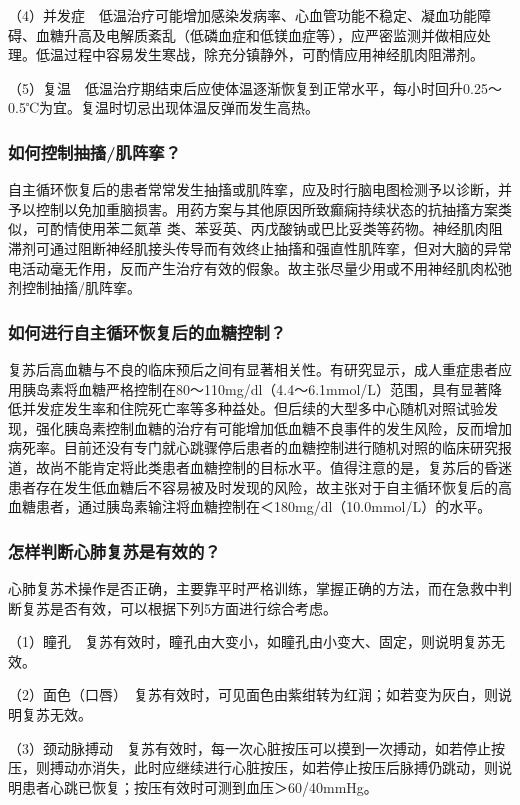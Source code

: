 （4）并发症　低温治疗可能增加感染发病率、心血管功能不稳定、凝血功能障碍、血糖升高及电解质紊乱（低磷血症和低镁血症等），应严密监测并做相应处理。低温过程中容易发生寒战，除充分镇静外，可酌情应用神经肌肉阻滞剂。

（5）复温　低温治疗期结束后应使体温逐渐恢复到正常水平，每小时回升0.25～0.5℃为宜。复温时切忌出现体温反弹而发生高热。

\subsubsection{如何控制抽搐/肌阵挛？}

自主循环恢复后的患者常常发生抽搐或肌阵挛，应及时行脑电图检测予以诊断，并予以控制以免加重脑损害。用药方案与其他原因所致癫痫持续状态的抗抽搐方案类似，可酌情使用苯二氮䓬
类、苯妥英、丙戊酸钠或巴比妥类等药物。神经肌肉阻滞剂可通过阻断神经肌接头传导而有效终止抽搐和强直性肌阵挛，但对大脑的异常电活动毫无作用，反而产生治疗有效的假象。故主张尽量少用或不用神经肌肉松弛剂控制抽搐/肌阵挛。

\subsubsection{如何进行自主循环恢复后的血糖控制？}

复苏后高血糖与不良的临床预后之间有显著相关性。有研究显示，成人重症患者应用胰岛素将血糖严格控制在80～110mg/dl（4.4～6.1mmol/L）范围，具有显著降低并发症发生率和住院死亡率等多种益处。但后续的大型多中心随机对照试验发现，强化胰岛素控制血糖的治疗有可能增加低血糖不良事件的发生风险，反而增加病死率。目前还没有专门就心跳骤停后患者的血糖控制进行随机对照的临床研究报道，故尚不能肯定将此类患者血糖控制的目标水平。值得注意的是，复苏后的昏迷患者存在发生低血糖后不容易被及时发现的风险，故主张对于自主循环恢复后的高血糖患者，通过胰岛素输注将血糖控制在＜180mg/dl（10.0mmol/L）的水平。

\subsubsection{怎样判断心肺复苏是有效的？}

心肺复苏术操作是否正确，主要靠平时严格训练，掌握正确的方法，而在急救中判断复苏是否有效，可以根据下列5方面进行综合考虑。

（1）瞳孔　复苏有效时，瞳孔由大变小，如瞳孔由小变大、固定，则说明复苏无效。

（2）面色（口唇）　复苏有效时，可见面色由紫绀转为红润；如若变为灰白，则说明复苏无效。

（3）颈动脉搏动　复苏有效时，每一次心脏按压可以摸到一次搏动，如若停止按压，则搏动亦消失，此时应继续进行心脏按压，如若停止按压后脉搏仍跳动，则说明患者心跳已恢复；按压有效时可测到血压＞60/40mmHg。

